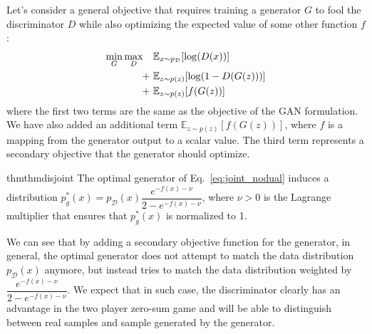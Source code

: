 Let's consider a general objective that requires training a generator $G$ to fool the discriminator $D$ while also optimizing the expected value of some other function $f$:
\begin{align}
   \min_{G} \max_{D} \quad & \mathbb{E}_{ x \sim p_{\mathcal{D}}} [\log(D(x))] \nonumber \\
+ \hspace{0.3em} & \mathbb{E}_{z \sim p(z)} [\log(1-D(G(z)))] \nonumber \\
+ \hspace{0.3em} & \mathbb{E}_{z \sim p(z)} [ f ( G(z) ) ] \label{eq:joint_nodual}
\end{align}
where the first two terms are the same as the objective of the GAN formulation. We have also added an additional term $\mathbb{E}_{z \sim p(z)} [ f ( G(z) ) ]$, where $f$ is a mapping from the generator output to a scalar value. The third term represents a secondary objective that the generator should optimize.
\begin{restatable}{thm}{thmdisjoint}
\label{thm_disjoint}
The optimal generator of Eq.~\ref{eq:joint_nodual} induces a distribution $ p^*_g(x) = p_{\mathcal{D}} (x) \dfrac{ e^{- f(x) - \nu} }{ 2 - e^{ - f(x) - \nu } }$, where $\nu > 0$ is the Lagrange multiplier that ensures that $p^*_g(x)$ is normalized to 1.
\end{restatable}

We can see that by adding a secondary objective function for the generator, in general, the optimal generator does not attempt to match the data distribution $ p_{\mathcal{D}} (x) $ anymore, but instead tries to match the data distribution weighted by $ \dfrac{ e^{- f(x) - \nu } }{ 2 - e^{ - f(x) - \nu } } $. We expect that in such case, the discriminator clearly has an advantage in the two player zero-sum game and will be able to distinguish between real samples and sample generated by the generator.

